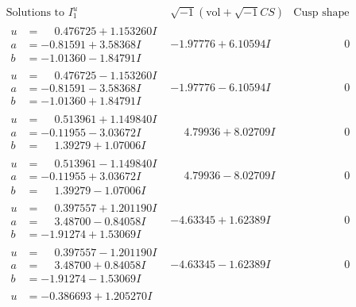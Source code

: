 \documentclass[1p]{elsarticle_modified}
\theoremstyle{definition}
\newcommand{\I}{\sqrt{-1}}
\begin{document}
$$\begin{array}{c|c|c}
\text{Solutions to }I^u_{1}& \I (\text{vol} + \sqrt{-1}CS) & \text{Cusp shape}\\
 \hline 
\begin{aligned}
u &= \phantom{-}0.476725 + 1.153260 I \\
a &= -0.81591 + 3.58368 I \\
b &= -1.01360 - 1.84791 I\end{aligned}
 & -1.97776 + 6.10594 I & \phantom{-0.000000 } 0 \\ \hline\begin{aligned}
u &= \phantom{-}0.476725 - 1.153260 I \\
a &= -0.81591 - 3.58368 I \\
b &= -1.01360 + 1.84791 I\end{aligned}
 & -1.97776 - 6.10594 I & \phantom{-0.000000 } 0 \\ \hline\begin{aligned}
u &= \phantom{-}0.513961 + 1.149840 I \\
a &= -0.11955 - 3.03672 I \\
b &= \phantom{-}1.39279 + 1.07006 I\end{aligned}
 & \phantom{-}4.79936 + 8.02709 I & \phantom{-0.000000 } 0 \\ \hline\begin{aligned}
u &= \phantom{-}0.513961 - 1.149840 I \\
a &= -0.11955 + 3.03672 I \\
b &= \phantom{-}1.39279 - 1.07006 I\end{aligned}
 & \phantom{-}4.79936 - 8.02709 I & \phantom{-0.000000 } 0 \\ \hline\begin{aligned}
u &= \phantom{-}0.397557 + 1.201190 I \\
a &= \phantom{-}3.48700 - 0.84058 I \\
b &= -1.91274 + 1.53069 I\end{aligned}
 & -4.63345 + 1.62389 I & \phantom{-0.000000 } 0 \\ \hline\begin{aligned}
u &= \phantom{-}0.397557 - 1.201190 I \\
a &= \phantom{-}3.48700 + 0.84058 I \\
b &= -1.91274 - 1.53069 I\end{aligned}
 & -4.63345 - 1.62389 I & \phantom{-0.000000 } 0 \\ \hline\begin{aligned}
u &= -0.386693 + 1.205270 I \\

\end{aligned}
\end{array}$$
\end{document}

